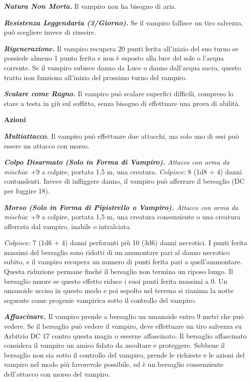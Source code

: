 \begin{multicols}{2}
\emph{\textbf{Natura Non Morta.}} Il vampiro non ha bisogno di aria.

\emph{\textbf{Resistenza Leggendaria (3/Giorno).}} Se il vampiro
fallisce un tiro salvezza, può scegliere invece di riuscire.



\emph{\textbf{Rigenerazione.}} Il vampiro recupera 20 punti ferita
all'inizio del suo turno se possiede almeno 1 punto ferita e non è
esposto alla luce del sole o l'acqua corrente. Se il vampiro subisce
danno da Luce o danno dall'acqua sacra, questo tratto non funziona
all'inizio del prossimo turno del vampiro.

\emph{\textbf{Scalare come Ragno.}} Il vampiro può scalare superfici
difficili, compreso lo stare a testa in giù sul soffitto, senza bisogno
di effettuare una prova di abilità.

\textbf{Azioni}

\emph{\textbf{Multiattacco.}} Il vampiro può effettuare due attacchi, ma
solo uno di essi può essere un attacco con morso.

\emph{\textbf{Colpo Disarmato (Solo in Forma di Vampiro).} Attacco con
arma da mischia}: +9 a colpire, portata 1,5 m, una creatura.
\emph{Colpisce:} 8 (1d8 + 4) danni contundenti. Invece di infliggere
danno, il vampiro può afferrare il bersaglio (DC per fuggire 18).

\emph{\textbf{Morso (Solo in Forma di Pipistrello o Vampiro).} Attacco
con arma da mischia}: +9 a colpire, portata 1,5 m, una creatura
consenziente o una creatura afferrata dal vampiro, inabile o
intralciata.

\emph{Colpisce:} 7 (1d6 + 4) danni perforanti più 10 (3d6) danni
necrotici. I punti ferita massimi del bersaglio sono ridotti di un
ammontare pari al danno necrotico subito, e il vampiro recupera un
numero di punti ferita pari a quell'ammontare. Questa riduzione permane
finché il bersaglio non termina un riposo lungo. Il bersaglio muore se
questo effetto riduce i suoi punti ferita massimi a 0. Un umanoide
ucciso in questo modo e poi sepolto nel terreno si rianima la notte
seguente come progenie vampirica sotto il controllo del vampiro.

\emph{\textbf{Affascinare.}} Il vampiro prende a bersaglio un umanoide
entro 9 metri che può vedere. Se il bersaglio può vedere il vampiro,
deve effettuare un tiro salvezza su Arbitrio DC 17 contro questa magia o
esserne affascinato. Il bersaglio affascinato considera il vampiro un
amico fidato da ascoltare e proteggere. Sebbene il bersaglio non sia
sotto il controllo del vampiro, prende le richieste e le azioni del
vampiro nel modo più favorevole possibile, ed è un bersaglio
consenziente dell'attacco con morso del vampiro.


\end{multicols}
